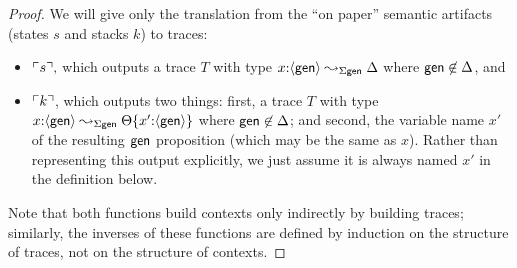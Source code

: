 \begin{proof}
We will give only the translation from the ``on paper''
semantic artifacts (states $s$ and stacks $k$) to traces:
\begin{itemize}
\item ${\ulcorner{s}\urcorner},$ which outputs 
a trace $T$ with type $x{:}\langle {\sf gen} \rangle \leadsto_{\Sigma\sf gen} \Delta$
where ${\sf gen} \not\in \Delta$, and 
\item ${\ulcorner{k}\urcorner}$, which outputs two things: first, a trace $T$ with
  type $x{:}\langle {\sf gen} \rangle \leadsto_{\Sigma\sf gen}
  {\Theta}\{{x'{:}\langle {\sf gen} \rangle}\}$ where ${\sf gen} \not\in
  \Delta$; and second, the variable name $x'$ of the resulting ${\sf
    gen}$ proposition (which may be the same as $x$). Rather than
  representing this output explicitly, we just assume it is always
  named $x'$ in the definition below.
\end{itemize}
Note that both functions build contexts only indirectly by building 
traces; similarly, the inverses of these functions are defined by induction
on the structure of traces, not on the structure of contexts.
\end{proof}
